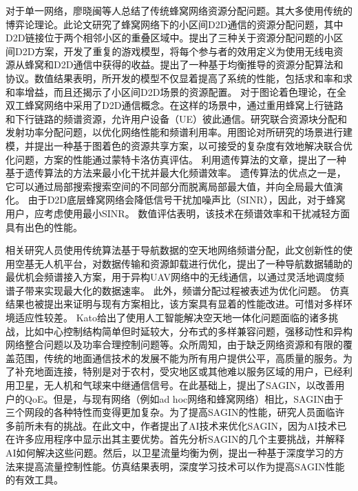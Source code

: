 对于单一网络，廖晓闽等人总结了传统蜂窝网络资源分配问题\cite{廖晓闽2019基于深度强化学习的蜂窝网资源分配算法}。其大多使用传统的博弈论理论\cite{6998030}。此论文研究了蜂窝网络下的小区间D2D通信的资源分配问题，其中D2D链接位于两个相邻小区的重叠区域中。提出了三种关于资源分配问题的小区间D2D方案，开发了重复的游戏模型，将每个参与者的效用定义为使用无线电资源从蜂窝和D2D通信中获得的收益。提出了一种基于均衡推导的资源分配算法和协议。数值结果表明，所开发的模型不仅显着提高了系统的性能，包括求和率和求和率增益，而且还揭示了小区间D2D场景的资源配置。
对于图论着色理论\cite{7833211}，在全双工蜂窝网络中采用了D2D通信概念。在这样的场景中，通过重用蜂窝上行链路和下行链路的频谱资源，允许用户设备（UE）彼此通信。研究联合资源块分配和发射功率分配问题，以优化网络性能和频谱利用率。用图论对所研究的场景进行建模，并提出一种基于图着色的资源共享方案，以可接受的复杂度有效地解决联合优化问题，方案的性能通过蒙特卡洛仿真评估。
利用遗传算法\cite{8336853}的文章，提出了一种基于遗传算法的方法来最小化干扰并最大化频谱效率。 遗传算法的优点之一是，它可以通过局部搜索搜索空间的不同部分而脱离局部最大值，并向全局最大值演化。 由于D2D底层蜂窝网络会降低信号干扰加噪声比（SINR），因此，对于蜂窝用户，应考虑使用最小SINR。 数值评估表明，该技术在频谱效率和干扰减轻方面具有出色的性能。

相关研究人员使用传统算法基于导航数据的空天地网络频谱分配，此文创新性的使用空基无人机平台，对数据传输和资源卸载进行优化，提出了一种导航数据辅助的最优机会频谱接入方案，用于异构UAV网络中的无线通信，以通过灵活地调度频谱子带来实现最大化的数据速率。  此外，频谱分配过程被表述为优化问题。 仿真结果也被提出来证明与现有方案相比，该方案具有显着的性能改进。可惜对多样环境适应性较差\cite{7127619}。
Kato给出了使用人工智能解决空天地一体化问题面临的诸多挑战，比如中心控制结构简单但时延较大，分布式的多样兼容问题，强移动性和异构网络整合问题以及功率合理控制问题等\cite{8612450}。众所周知，由于缺乏网络资源和有限的覆盖范围，传统的地面通信技术的发展不能为所有用户提供公平，高质量的服务。为了补充地面连接，特别是对于农村，受灾地区或其他难以服务区域的用户，已经利用卫星，无人机和气球来中继通信信号。在此基础上，提出了SAGIN，以改善用户的QoE。但是，与现有网络（例如ad hoc网络和蜂窝网络）相比，SAGIN由于三个网段的各种特性而变得更加复杂。为了提高SAGIN的性能，研究人员面临许多前所未有的挑战。在此文中，作者提出了AI技术来优化SAGIN，因为AI技术已在许多应用程序中显示出其主要优势。首先分析SAGIN的几个主要挑战，并解释AI如何解决这些问题。然后，以卫星流量均衡为例，提出一种基于深度学习的方法来提高流量控制性能。仿真结果表明，深度学习技术可以作为提高SAGIN性能的有效工具。

